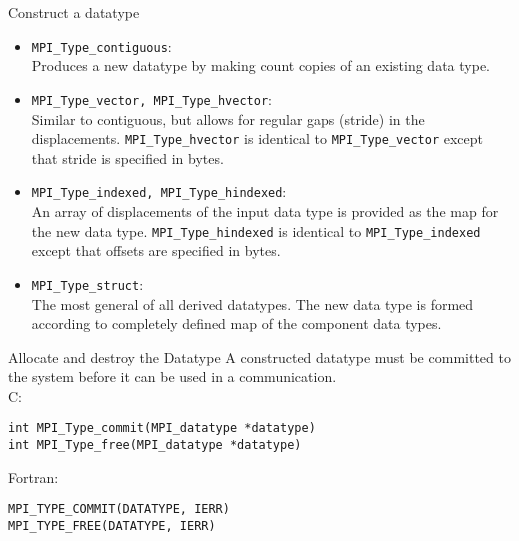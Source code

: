 \documentclass[aspectratio=43]{beamer}
\begin{document}
\begin{frame}[fragile]{Construct a datatype}
\begin{itemize}
\item \verb+MPI_Type_contiguous+:\\
Produces a new datatype by making count copies of an existing data type.

\item \verb+MPI_Type_vector, MPI_Type_hvector+:\\
Similar to contiguous, but allows for regular gaps (stride) in the displacements.
\verb+MPI_Type_hvector+ is identical to \verb+MPI_Type_vector+ except that stride is specified in bytes.

\item \verb+MPI_Type_indexed, MPI_Type_hindexed+:\\
An array of displacements of the input data type is provided as the map for the new data type.
\verb+MPI_Type_hindexed+ is identical to \verb+MPI_Type_indexed+ except that offsets are specified in bytes.

\item \verb+MPI_Type_struct+:\\
The most general of all derived datatypes. The new data type is formed according to completely defined map of the component data types.
\end{itemize}

\end{frame}

\begin{frame}[fragile]{Allocate and destroy the Datatype}
A constructed datatype must be committed to the system before it can be used in a communication.\\
\footnotesize
C:
\vspace{-0.2cm}
\begin{verbatim}
int MPI_Type_commit(MPI_datatype *datatype)
int MPI_Type_free(MPI_datatype *datatype)
\end{verbatim}
\vspace{-0.2cm}
Fortran:
\vspace{-0.2cm}
\begin{verbatim}
MPI_TYPE_COMMIT(DATATYPE, IERR)
MPI_TYPE_FREE(DATATYPE, IERR)
\end{verbatim}
\end{frame}
\end{document}
